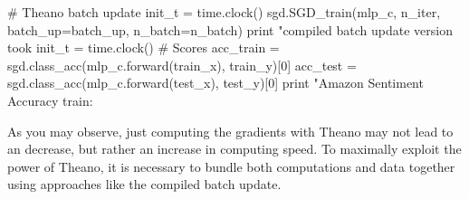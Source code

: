 \begin{exercise}
\begin{python}
# Theano batch update
init_t = time.clock()
sgd.SGD_train(mlp_c, n_iter, batch_up=batch_up, n_batch=n_batch)
print "\nTheano compiled batch update version took %
init_t = time.clock()
# Scores
acc_train = sgd.class_acc(mlp_c.forward(train_x), train_y)[0]
acc_test  = sgd.class_acc(mlp_c.forward(test_x), test_y)[0]
print "Amazon Sentiment Accuracy train: %
\end{python}
As you may observe, just computing the gradients with Theano may not lead to
an decrease, but rather an increase in computing speed. To maximally exploit
the power of Theano, it is necessary to bundle both computations and data 
together using approaches like the compiled batch update.
\end{exercise}
